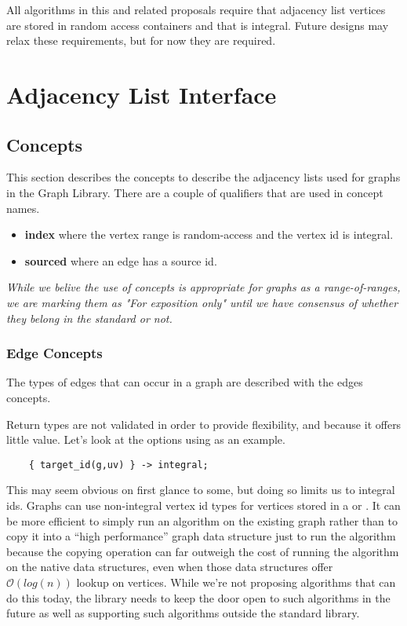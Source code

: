 All algorithms in this and related proposals require that adjacency list vertices are stored in random access containers and that  
is integral. Future designs may relax these requirements, but for now they are required.

\section{Adjacency List Interface}

\subsection{Concepts}

This section describes the concepts to describe the adjacency lists used for graphs in the Graph Library. There are 
a couple of qualifiers that are used in concept names.
\begin{itemize}
    \item \textbf{index} where the vertex range is random-access and the vertex id is integral.
    \item \textbf{sourced} where an edge has a source id.
\end{itemize}

\emph{While we belive the use of concepts is appropriate for graphs as a range-of-ranges, we are marking them as "For exposition only" 
until we have consensus of whether they belong in the standard or not.}

\subsubsection{Edge Concepts}
The types of edges that can occur in a graph are described with the edges concepts.
{\small
     
}

Return types are not validated in order to provide flexibility, and because it offers little value. Let's look at the options using 
 as an example.

\begin{lstlisting}
    { target_id(g,uv) } -> integral;
\end{lstlisting}
This may seem obvious on first glance to some, but doing so limits us to integral ids. Graphs can use non-integral vertex id types for 
vertices stored in a  or . 
It can be more efficient to simply run an algorithm on the existing graph rather than to copy it into a “high performance” graph data 
structure just to run the algorithm because the copying operation can far outweigh the cost of running the algorithm on the native data 
structures, even when those data structures offer $\mathcal{O}(log(n))$ lookup on vertices. While we're not proposing algorithms that 
can do this today, the library needs to keep the door open to such algorithms in the future as well as supporting such algorithms 
outside the standard library.

